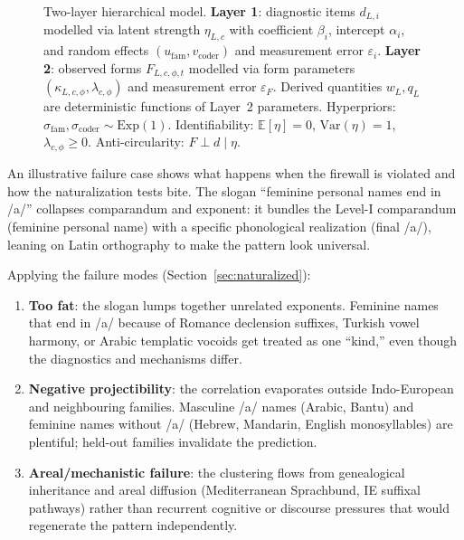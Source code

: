 \documentclass[12pt]{article}
\begin{document}
\begin{figure}[ht]
 \caption{Two-layer hierarchical model. \textbf{Layer 1}: diagnostic items $d_{L,i}$ modelled via latent strength $\eta_{L,c}$ with coefficient $\beta_i$, intercept $\alpha_i$, and random effects $(u_{\text{fam}}, v_{\text{coder}})$ and measurement error $\varepsilon_i$. \textbf{Layer 2}: observed forms $F_{L,c,\phi,t}$ modelled via form parameters $(\kappa_{L,c,\phi}, \lambda_{c,\phi})$ and measurement error $\varepsilon_F$. Derived quantities $w_L, q_L$ are deterministic functions of Layer~2 parameters. Hyperpriors: $\sigma_{\text{fam}},\sigma_{\text{coder}}\sim\text{Exp}(1)$. Identifiability: $\mathbb{E}[\eta]=0$, $\text{Var}(\eta)=1$, $\lambda_{c,\phi}\geq 0$. Anti-circularity: $F \perp d \mid \eta$.}
 \label{fig:dag}
 \end{figure}

An illustrative failure case shows what happens when the firewall is violated and how the naturalization tests bite. The slogan \enquote{feminine personal names end in /a/} collapses comparandum and exponent: it bundles the Level-I comparandum (feminine personal name) with a specific phonological realization (final /a/), leaning on Latin orthography to make the pattern look universal.

Applying the failure modes (Section~\ref{sec:naturalized}):

\begin{enumerate}[label=(\roman*), leftmargin=*]
    \item \textbf{Too fat}: the slogan lumps together unrelated exponents. Feminine names that end in /a/ because of Romance declension suffixes, Turkish vowel harmony, or Arabic templatic vocoids get treated as one \enquote{kind,} even though the diagnostics and mechanisms differ.
    \item \textbf{Negative projectibility}: the correlation evaporates outside Indo-European and neighbouring families. Masculine /a/ names (Arabic, Bantu) and feminine names without /a/ (Hebrew, Mandarin, English monosyllables) are plentiful; held-out families invalidate the prediction.
    \item \textbf{Areal/mechanistic failure}: the clustering flows from genealogical inheritance and areal diffusion (Mediterranean Sprachbund, IE suffixal pathways) rather than recurrent cognitive or discourse pressures that would regenerate the pattern independently.
\end{enumerate}
\end{document}
